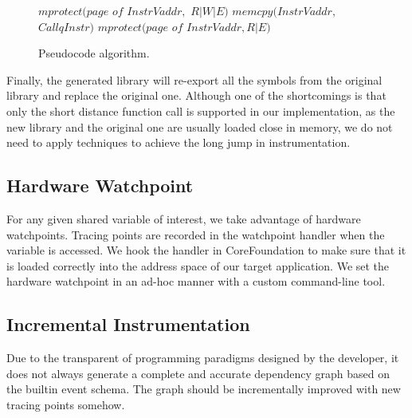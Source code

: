 \begin{figure}
    \begin{algorithmic}[1]
        \State $mprotect(page$ $of$ $InstrVaddr,$ $R|W|E)$
        \State $memcpy(InstrVaddr,$ $CallqInstr)$
        \State $mprotect(page$ $of$ $InstrVaddr, R|E)$
        \EndFor
        \EndProcedure
    \end{algorithmic}
    \label{fig:pseudo-code}
    \caption{Pseudocode algorithm.}
\end{figure}

Finally, the generated library will re-export all the symbols from the original library and replace the original one.
Although one of the shortcomings is that only the short distance function call is supported in our implementation, as the new library and the original one are usually loaded close in memory, we do not need to apply techniques to achieve the long jump in instrumentation.
\subsection{Hardware Watchpoint}
For any given shared variable of interest, we take advantage of hardware watchpoints.
Tracing points are recorded in the watchpoint handler when the variable is accessed.
We hook the handler in CoreFoundation to make sure that it is loaded correctly into the address space of our target application.
We set the hardware watchpoint in an ad-hoc manner with a custom command-line tool.

\subsection{Incremental Instrumentation}
Due to the transparent of programming paradigms designed by the developer, it does not always generate a complete and accurate dependency graph based on the builtin event schema.
The graph should be incrementally improved with new tracing points somehow.

